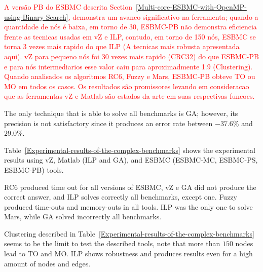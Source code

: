 \textcolor{red}{A versão PB do ESBMC descrita Section~\ref{Multi-core-ESBMC-with-OpenMP-using-Binary-Search}, demonstra um avanco significativo na ferramenta; quando a quantidade de nós é baixa, em torno de 30, ESBMC-PB não demonstra eficiencia frente as tecnicas usadas em vZ e ILP, contudo, em torno de 150 nós, ESBMC se torna 3 vezes mais rapido do que ILP (A tecnicas mais robusta apresentada aqui). vZ para pequeno nós foi 30 vezes mais rapido (CRC32) do que ESBMC-PB e para nós intermediarios esse valor caiu para aproximadmente 1.9 (Clustering). Quando analisados os algoritmos RC6, Fuzzy e Mars, ESBMC-PB obteve TO ou MO em todos os casos. Os resultados são promissores levando em consideracao que as ferramentas vZ e Matlab são estados da arte em suas respectivas funcoes. }

The only technique that is able to solve all benchmarks is GA; however, its precision is not satisfactory since it produces an error rate between $-37.6$\% and $29.0$\%.

Table~\ref{Experimental-results-of-the-complex-benchmarks} shows the experimental results using vZ, Matlab (ILP and GA), and ESBMC (ESBMC\hyp{}MC, ESBMC\hyp{}PS, ESBMC\hyp{}PB) tools.

RC$6$ produced time out for all versions of ESBMC, vZ e GA did not produce the correct answer, and ILP solves correctly all benchmarks, except one. Fuzzy produced time-outs and memory-outs in all tools. ILP was the only one to solve Mars, while GA solved incorrectly all benchmarks.

Clustering described in Table~\ref{Experimental-results-of-the-complex-benchmarks} seems to be the limit to test the described tools, note that more than $150$ nodes lead to TO and MO. ILP shows robustness and produces results even for a high amount of nodes and edges.

